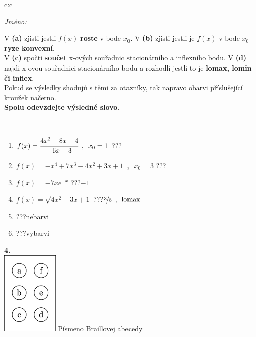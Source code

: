 \documentclass[10pt]{report}
\begin{document}
\begin{tabular}{c:c}
\begin{minipage}[c][104.5mm][t]{0.5\linewidth}
\begin{center}
\textit{Jméno:}\phantom{xxxxxxxxxxxxxxxxxxxxxxxxxxxxxxxxxxxxxxxxxxxxxxxxxxxxxxxxxxxxxxxxx}\\[5mm]
\begin{minipage}{0.95\linewidth}
\begin{center}
{\small V \textbf{(a)} zjisti jestli $f(x)$ \textbf{roste} v bode $x_0$. V \textbf{(b)} zjisti jestli je $f(x)$ v bode $x_0$ \textbf{ryze konvexní}.\\V \textbf{(c)} spočti \textbf{součet} x-ových souřadnic stacionárního a inflexního bodu. V \textbf{(d)} najdi x-ovou souřadnici stacionárního bodu a rozhodli jestli to je \textbf{lomax, lomin či inflex}.\\Pokud se výsledky shodujú s těmi za otazníky, tak napravo obarvi příslušející kroužek načerno.\\\textbf{Spolu odevzdejte výsledné slovo}}.
\end{center}
\end{minipage}
\\[1mm]
\begin{minipage}{0.79\linewidth}
\begin{center}
\begin{varwidth}{\linewidth}
\begin{enumerate}
\normalsize
\item $f(x)=\cfrac{4x^2-8x-4}{-6x+3}\enspace , \enspace x_0=1$\quad \dotfill\; ???\;\dotfill \quad {}
\item $f(x)=-x^4+7x^3-4x^2+3x+1\enspace , \enspace x_0=3$\quad \dotfill\; ???\;\dotfill \quad {}
\item $f(x)=-7xe^{-x}$\quad \dotfill\; ???\;\dotfill \quad $-1$
\item $f(x)=\sqrt{4x^2-3x+1}$\quad \dotfill\; ???\;\dotfill \quad $\nicefrac{3}{8}\enspace , \enspace\mathrm{lomax}$
\item \quad \dotfill\; ???\;\dotfill \quad nebarvi
\item \quad \dotfill\; ???\;\dotfill \quad vybarvi
\end{enumerate}
\end{varwidth}
\end{center}
\end{minipage}
\begin{minipage}{0.20\linewidth}
\begin{center}
{\Huge\bfseries 4.} \\[2mm]
\includegraphics[height=40mm]{../images/braille.png}
{\small Písmeno Braillovej abecedy}
\end{center}
\end{minipage}
\end{center}
\end{minipage}
%
\end{tabular}
\end{document}
